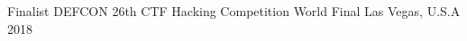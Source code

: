 



\begin{cvhonors}

  \cvhonor
    {Finalist} %
    {DEFCON 26th CTF Hacking Competition World Final} %
    {Las Vegas, U.S.A} %
    {2018} %

\end{cvhonors}


%
%
%
%
%
%
%
%
%
%
%
